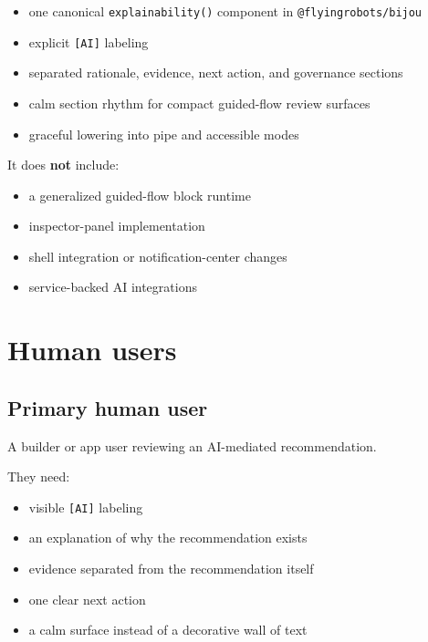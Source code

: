 \begin{itemize}
\tightlist
\item
  one canonical \texttt{e\allowbreak{}x\allowbreak{}p\allowbreak{}l\allowbreak{}a\allowbreak{}i\allowbreak{}n\allowbreak{}a\allowbreak{}b\allowbreak{}i\allowbreak{}l\allowbreak{}i\allowbreak{}t\allowbreak{}y\allowbreak{}(\allowbreak{})} component in \texttt{@\allowbreak{}f\allowbreak{}l\allowbreak{}y\allowbreak{}i\allowbreak{}n\allowbreak{}g\allowbreak{}r\allowbreak{}o\allowbreak{}b\allowbreak{}o\allowbreak{}t\allowbreak{}s\allowbreak{}/\allowbreak{}b\allowbreak{}i\allowbreak{}j\allowbreak{}o\allowbreak{}u}
\item
  explicit \texttt{[\allowbreak{}A\allowbreak{}I\allowbreak{}]} labeling
\item
  separated rationale, evidence, next action, and governance sections
\item
  calm section rhythm for compact guided-flow review surfaces
\item
  graceful lowering into pipe and accessible modes
\end{itemize}

It does \textbf{not} include:

\begin{itemize}
\tightlist
\item
  a generalized guided-flow block runtime
\item
  inspector-panel implementation
\item
  shell integration or notification-center changes
\item
  service-backed AI integrations
\end{itemize}

\section{Human users}\label{record-172-human-users}

\subsection{Primary human user}\label{record-172-primary-human-user}

A builder or app user reviewing an AI-mediated recommendation.

They need:

\begin{itemize}
\tightlist
\item
  visible \texttt{[\allowbreak{}A\allowbreak{}I\allowbreak{}]} labeling
\item
  an explanation of why the recommendation exists
\item
  evidence separated from the recommendation itself
\item
  one clear next action
\item
  a calm surface instead of a decorative wall of text
\end{itemize}

